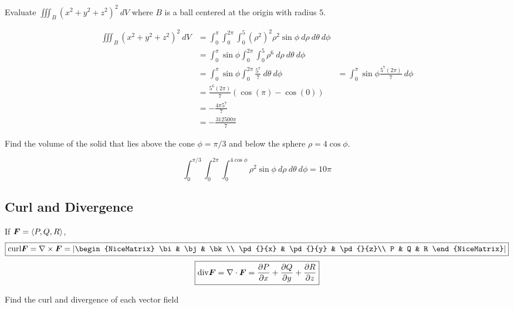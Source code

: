 \documentclass[12pt]{exam}
\begin{document}
\begin{questions}
\question Evaluate \(\iiint_B(x^2+y^2+z^2)^2~dV\) where \(B\) is a ball centered at the origin with radius \(5\).
\ifprintanswers
        \begin{solution}
        \begin{align*}
            \iiint_B(x^2+y^2+z^2)^2~dV &= \int_0^{\pi}\int_0^{2\pi}\int_0^5 (\rho^2)^2\rho^2\sin\phi~d\rho~d\theta~d\phi\\
            & = \int_0^{\pi}\sin\phi\int_0^{2\pi}\int_0^5 \rho^6~d\rho~d\theta~d\phi\\
            & = \int_0^{\pi}\sin\phi\int_0^{2\pi} \frac{5^7}{7}~d\theta~d\phi
            & = \int_0^\pi \sin\phi \frac{5^7(2\pi)}{7} ~d\phi\\
            & = \frac{5^6(2\pi)}{7}\left(\cos(\pi)-\cos(0)\right)\\
            & = -\frac{4\pi5^7}{7}\\
            & = -\frac{312500\pi}{7}
        \end{align*}
        \end{solution}
    \else
        \vfill
    \fi

\question Find the volume of the solid that lies above the cone \(\phi=\pi/3\) and below the sphere \(\rho=4\cos\phi\).
\ifprintanswers
        \begin{solution}
            \[\int_0^{\pi/3}\int_0^{2\pi}\int_0^{4\cos\phi}\rho^2\sin\phi~d\rho~d\theta~d\phi=10\pi\]
        \end{solution}
    \else
        \vfill
    \fi

\newpage

\subsection*{Curl and Divergence}

If \(\bm{F}=\left\langle P,Q,R \right\rangle\),
\[\boxed{
    \mathrm{curl}\bm{F}=\nabla\times \bm{F}=\left|
    \begin{NiceMatrix}
    \bi & \bj & \bk \\
    \pd{}{x} & \pd{}{y} & \pd{}{z}\\
    P & Q & R
    \end{NiceMatrix}\right|}
\]
\[
    \boxed{\mathrm{div}\bm{F} = \nabla\cdot\bm{F}=\dfrac{\partial P}{\partial x}+\dfrac{\partial Q}{\partial y}+\dfrac{\partial R}{\partial z}}
\]

\question Find the curl and divergence of each vector field
\begin{parts}

\end{parts}
\end{questions}
\end{document}
